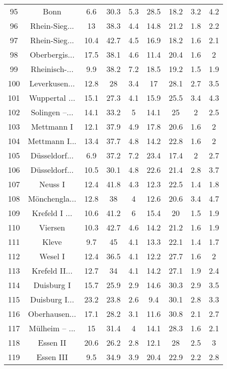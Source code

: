 \begin{table}[!htbp]
\begin{tabular}{@{\extracolsep{5pt}} ccccccccc}
95 & Bonn & 6.6 & 30.3 & 5.3 & 28.5 & 18.2 & 3.2 & 4.2 \\ 
96 & Rhein-Sieg... & 13 & 38.3 & 4.4 & 14.8 & 21.2 & 1.8 & 2.2 \\ 
97 & Rhein-Sieg... & 10.4 & 42.7 & 4.5 & 16.9 & 18.2 & 1.6 & 2.1 \\ 
98 & Oberbergis... & 17.5 & 38.1 & 4.6 & 11.4 & 20.4 & 1.6 & 2 \\ 
99 & Rheinisch-... & 9.9 & 38.2 & 7.2 & 18.5 & 19.2 & 1.5 & 1.9 \\ 
100 & Leverkusen... & 12.8 & 28 & 3.4 & 17 & 28.1 & 2.7 & 3.5 \\ 
101 & Wuppertal ... & 15.1 & 27.3 & 4.1 & 15.9 & 25.5 & 3.4 & 4.3 \\ 
102 & Solingen –... & 14.1 & 33.2 & 5 & 14.1 & 25 & 2 & 2.5 \\ 
103 & Mettmann I & 12.1 & 37.9 & 4.9 & 17.8 & 20.6 & 1.6 & 2 \\ 
104 & Mettmann I... & 13.4 & 37.7 & 4.8 & 14.2 & 22.8 & 1.6 & 2 \\ 
105 & Düsseldorf... & 6.9 & 37.2 & 7.2 & 23.4 & 17.4 & 2 & 2.7 \\ 
106 & Düsseldorf... & 10.5 & 30.1 & 4.8 & 22.6 & 21.4 & 2.8 & 3.7 \\ 
107 & Neuss I & 12.4 & 41.8 & 4.3 & 12.3 & 22.5 & 1.4 & 1.8 \\ 
108 & Mönchengla... & 12.8 & 38 & 4 & 12.6 & 20.6 & 3.4 & 4.7 \\ 
109 & Krefeld I ... & 10.6 & 41.2 & 6 & 15.4 & 20 & 1.5 & 1.9 \\ 
110 & Viersen & 10.3 & 42.7 & 4.6 & 14.2 & 21.2 & 1.6 & 1.9 \\ 
111 & Kleve & 9.7 & 45 & 4.1 & 13.3 & 22.1 & 1.4 & 1.7 \\ 
112 & Wesel I & 12.4 & 36.5 & 4.1 & 12.2 & 27.7 & 1.6 & 2 \\ 
113 & Krefeld II... & 12.7 & 34 & 4.1 & 14.2 & 27.1 & 1.9 & 2.4 \\ 
114 & Duisburg I & 15.7 & 25.9 & 2.9 & 14.6 & 30.3 & 2.9 & 3.5 \\ 
115 & Duisburg I... & 23.2 & 23.8 & 2.6 & 9.4 & 30.1 & 2.8 & 3.3 \\ 
116 & Oberhausen... & 17.1 & 28.2 & 3.1 & 11.6 & 30.8 & 2.1 & 2.7 \\ 
117 & Mülheim – ... & 15 & 31.4 & 4 & 14.1 & 28.3 & 1.6 & 2.1 \\ 
118 & Essen II & 20.6 & 26.2 & 2.8 & 12.1 & 28 & 2.5 & 3 \\ 
119 & Essen III & 9.5 & 34.9 & 3.9 & 20.4 & 22.9 & 2.2 & 2.8 \\ 

\end{tabular}
\end{table}
